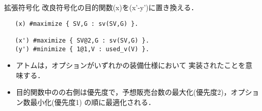 \documentclass[dvipdfmx, 11pt]{beamer}
\begin{document}

\begin{frame}[fragile]{拡張符号化}
 改良符号化の目的関数(x)を(x'-y')に置き換える．
 \begin{exampleblock}{}
  \begin{lstlisting}
   (x) #maximize { SV,G : sv(SV,G) }.

   (x') #maximize { SV@2,G : sv(SV,G) }.
   (y') #minimize { 1@1,V : used_v(V) }.
  \end{lstlisting}
 \end{exampleblock}
 \begin{itemize}
  \item アトムは，オプションがいずれかの装備仕様において
	実装されたことを意味する．
  \item 目的関数中のの右側は優先度で，予想販売台数の最大化(優先度2)，オプション数最小化(優先度1)
	の順に最適化される．
 \end{itemize}
\end{frame}
\end{document}
